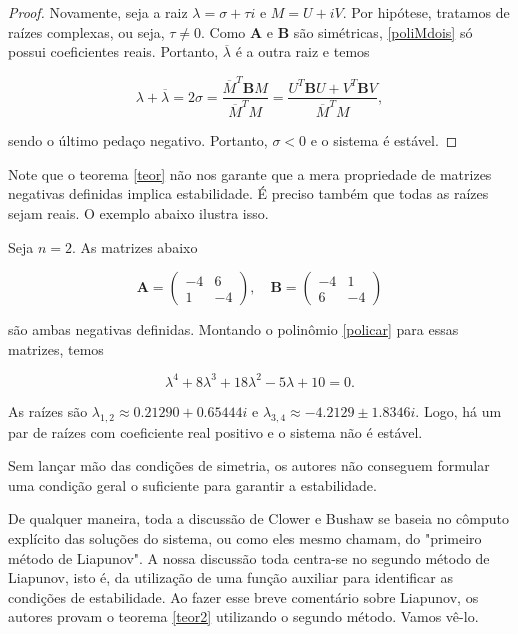 \documentclass[
	12pt,				%
	openright,			%
	twoside,			%
	a4paper,			%
	english,			%
	french,				%
	spanish,			%
	brazil				%
	]{abntex2}
\newcommand{\B}{\boldsymbol{B}}
\newcommand{\A}{\boldsymbol{A}}
\newcommand{\Mbarra}{\overline{M}}
\begin{document}
\begin{proof}
	Novamente, seja a raiz $\lambda = \sigma + \tau i$ e $M = U + iV$. Por hipótese, tratamos de
	raízes complexas, ou seja, $\tau \neq 0$. Como $\A$ e $\B$ são simétricas, \ref{poliMdois}
	só possui coeficientes reais. Portanto, $\overline{\lambda}$ é a outra raiz e temos

	\begin{equation}
		\lambda + \overline{\lambda} = 2\sigma = \frac{\Mbarra^T \B M}{\Mbarra^T M} = \frac{U^T \B U + V^T \B V}{\Mbarra^T M},
	\end{equation}

	sendo o último pedaço negativo. Portanto, $\sigma < 0$ e o sistema é estável.
\end{proof}

Note que o teorema \ref{teor} não nos garante que a mera propriedade de matrizes
negativas definidas implica estabilidade. É preciso também que todas as raízes sejam
reais. O exemplo abaixo ilustra isso.

Seja $n = 2$. As matrizes abaixo

\begin{equation}
	\A =
	\begin{pmatrix}
		-4 & 6 \\
		1 & -4
	\end{pmatrix}, \quad
	\B =
	\begin{pmatrix}
		-4 & 1 \\
		6  & -4
	\end{pmatrix}
\end{equation}

são ambas negativas definidas. Montando o polinômio \ref{policar} para
essas matrizes, temos

\begin{equation}
	\lambda^4 + 8\lambda^3 + 18\lambda^2 - 5\lambda + 10 = 0.
\end{equation}

As raízes são $\lambda_{1,2} \approx 0.21290 + 0.65444i$ e $\lambda_{3, 4} \approx -4.2129 \pm 1.8346i$.
Logo, há um par de raízes com coeficiente real positivo e o sistema não é estável.

Sem lançar mão das condições de simetria, os autores não conseguem formular uma condição geral o suficiente
para garantir a estabilidade.

De qualquer maneira, toda a discussão de Clower e Bushaw se baseia no cômputo explícito das
soluções do sistema, ou como eles mesmo chamam, do "primeiro método de Liapunov".
A nossa discussão toda centra-se no segundo método de Liapunov, isto é, da utilização
de uma função auxiliar para identificar as condições de estabilidade. Ao fazer
esse breve comentário sobre Liapunov, os autores provam o teorema \ref{teor2}
utilizando o segundo método. Vamos vê-lo.
\end{document}

